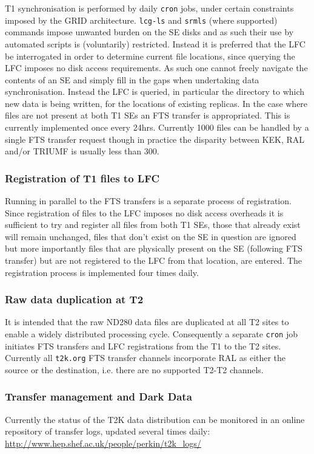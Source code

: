 \documentclass[11pt]{article}
\begin{document}
T1 synchronisation is performed by daily \verb+cron+ jobs, under
certain constraints imposed by the GRID architecture. \verb+lcg-ls+
and \verb+srmls+ (where supported) commands impose unwanted burden on
the SE disks and as such their use by automated scripts is (voluntarily)
restricted. Instead it is preferred that the LFC be interrogated in
order to determine current file locations, since querying the LFC
imposes no disk access requirements. As such one cannot freely
navigate the contents of an SE and simply fill in the gaps when
undertaking data synchronisation. Instead the LFC is queried, in
particular the directory to which new data is being written, for the
locations of existing replicas. In the case where files are not
present at both T1 SEs an FTS transfer is appropriated. This is
currently implemented once every 24hrs. Currently 1000 files can be
handled by a single FTS transfer request though in practice the
disparity between KEK, RAL and/or TRIUMF is usually less than 300.

\subsubsection*{Registration of T1 files to LFC}
Running in parallel to the FTS transfers is a separate process of
registration. Since registration of files to the LFC imposes no disk
access overheads it is sufficient to try and register all files from
both T1 SEs, those that already exist will remain unchanged, files
that don't exist on the SE in question are ignored but more importantly
files that are physically present on the SE (following FTS transfer)
but are not registered to the LFC from that location, are
entered. The registration process is implemented four times daily.

\subsubsection*{Raw data duplication at T2}
It is intended that the raw ND280 data files are duplicated at all T2
sites to enable a widely distributed processing cycle. Consequently a
separate \verb+cron+ job initiates FTS transfers and LFC registrations from
the T1 to the T2 sites. Currently all \verb+t2k.org+ FTS transfer
channels incorporate RAL as either the source or the destination,
i.e. there are no supported T2-T2 channels.

\subsubsection*{Transfer management and Dark Data}
Currently the status of the T2K data distribution can be monitored in
an online repository of transfer logs, updated several times daily:
\url{http://www.hep.shef.ac.uk/people/perkin/t2k_logs/}
\end{document}
